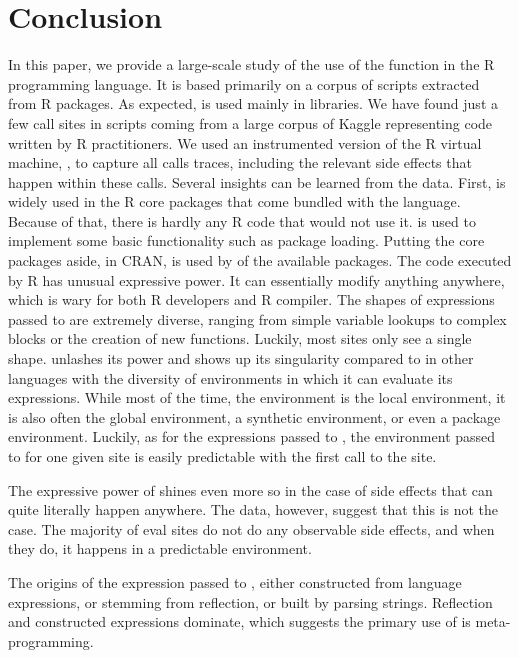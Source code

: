 \documentclass[review,screen,acmsmall,anonymous=true]{acmart}
\begin{document}
\section{Conclusion}

In this paper, we provide a large-scale study of the use of the \eval function
in the R programming language. It is based primarily on a corpus of
\CranRunnableScripts scripts extracted from \CranPackages R packages. As
expected, \eval is used mainly in libraries. We have found just a few \eval
call sites in scripts coming from a large corpus of Kaggle representing code
written by R practitioners. We used an instrumented version of the R virtual
machine, \rdyntrace, to capture all \eval calls traces, including the relevant
side effects that happen within these calls. Several insights can be learned
from the data.
%
First, \eval is widely used in the R core packages that come bundled with the
language. Because of that, there is hardly any R code that would not use it.
\eval is used to implement some basic functionality such as package loading.
Putting the core packages aside, in CRAN, \eval is used by \PkgPackagesRatio of
the available \CranPackages packages.
%
The code executed by R \eval has unusual expressive power. It can essentially
modify anything anywhere, which is wary for both R developers and R compiler. The shapes of expressions passed to \eval are extremely diverse, ranging from simple variable lookups to complex blocks or the creation of new functions. Luckily, most sites only see a single shape. \eval unlashes its power and shows up its singularity compared to \eval in other languages with the diversity of environments in which it can evaluate its expressions. While most of the time, the \eval environment is the local environment, it is also often the global environment, a synthetic environment, or even a package environment. Luckily, as for the expressions passed to \eval, the environment passed to \eval for one given site is easily predictable with the first call to the site.

The expressive power of \eval shines even more  so in the case of side effects that can quite literally happen anywhere. The data, however, suggest that this is not the case. The majority of eval sites do not do any observable side effects,  and when they do, it happens in a predictable environment.

The origins of the expression passed to \eval, either constructed from language expressions, or stemming from reflection, or built by parsing strings. Reflection and constructed expressions dominate, which suggests the primary   use of \eval is meta-programming. %
\end{document}
